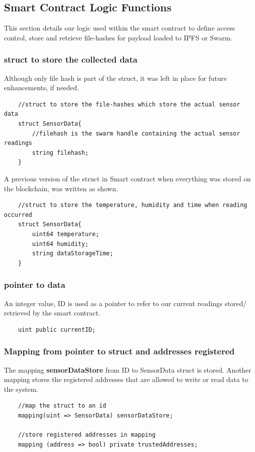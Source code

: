 \documentclass[11pt,openright]{report}
\begin{document}
\subsection{Smart Contract Logic Functions}
This section details our logic used within the smart contract to define access control, store and retrieve file-hashes for payload loaded to IPFS or Swarm. 

\subsubsection{struct to store the collected data}
Although only file hash is part of the struct, it was left in place for future enhancements, if needed.
\begin{verbatim}
    //struct to store the file-hashes which store the actual sensor data
    struct SensorData{
        //filehash is the swarm handle containing the actual sensor readings
        string filehash;
    }
\end{verbatim}

A previous version of the struct in Smart contract when everything was stored on the blockchain, was written as shown.

\begin{verbatim}
    //struct to store the temperature, humidity and time when reading occurred
    struct SensorData{
        uint64 temperature;
        uint64 humidity;
        string dataStorageTime;
    }
\end{verbatim}

\subsubsection{pointer to data}
An integer value, ID is used as a pointer to refer to our current readings stored/ retrieved by the smart contract.
\begin{verbatim}
    uint public currentID;
\end{verbatim}

\subsubsection{Mapping from pointer to struct and addresses registered}
The mapping \textbf{sensorDataStore} from ID to SensorData struct is stored. Another mapping stores the registered addresses that are allowed to write or read data to the system.
\begin{verbatim}
    //map the struct to an id
    mapping(uint => SensorData) sensorDataStore;

    //store registered addresses in mapping
    mapping (address => bool) private trustedAddresses;
\end{verbatim}
\end{document}

